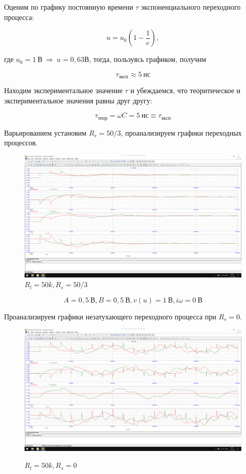 \documentclass[a4paper, 12pt]{article}
\begin{document}
    Оценим по графику постоянную времени $\tau$ экспоненциального переходного процесса:

    \[u = u_0 (1 - \frac{1}{e}),\]

    где $u_0 = 1 \: \textit{В} \: \Rightarrow \: u = 0,63 \textit{В}$, тогда, пользуясь графиком, получим

    \[\tau_{эксп} \approx 5 \: \textit{нс}\]

    Находим экспериментальное значение $\tau$ и убеждаемся, что теоритическое и экспериментальное значения равны друг другу:

    \[\tau_{теор} = \omega C = 5 \: \textit{нс} \equiv \tau_{эксп}\]

    Варьированием установим $R_s = 50/3$, проанализируем графики переходных процессов.

    \begin{figure}[H]
    \centering
    \includegraphics[width = 14 cm]{images/Graph16.png}
    \caption{$R_l = 50k, R_s = 50/3$}
    \end{figure}

    \[A = 0,5 \: \text{В}, B = 0,5 \: \text{В}, v(u) = 1 \: \text{В}, i\omega = 0 \: \text{В}\]

    Проанализируем графики незатухающего переходного процесса при $R_s = 0$.

    \begin{figure}[H]
    \centering
    \includegraphics[width = 14 cm]{images/Graph17.png}
    \label{fig:Image1}
    \caption{$R_l = 50k, R_s = 0$}
    \end{figure}
    
\end{document}
